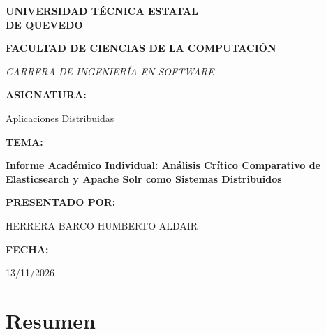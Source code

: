\documentclass[12pt,a4paper]{article}
\begin{document}
\thispagestyle{empty}
\begin{center}
\vspace*{1.5cm}

{\fontsize{22}{26}\selectfont\bfseries UNIVERSIDAD TÉCNICA ESTATAL\\[4pt] DE QUEVEDO\par}

\vspace{1.4cm}

{\large\bfseries FACULTAD DE CIENCIAS DE LA COMPUTACIÓN\par}

\vspace{1.2cm}

{\small\itshape CARRERA DE INGENIERÍA EN SOFTWARE\par}

\vspace{1.2cm}

{\large\bfseries ASIGNATURA:\par}
{\large Aplicaciones Distribuidas\par}

{\large\bfseries TEMA:\par}
\vspace{0.4cm}
{\large\bfseries Informe Académico Individual: Análisis Crítico Comparativo de Elasticsearch y Apache Solr como Sistemas Distribuidos\par}

\vspace{1.0cm}

{\large\bfseries PRESENTADO POR:\par}
\vspace{2pt}
{\large HERRERA BARCO HUMBERTO ALDAIR\par}

\vspace{1.0cm}

{\large\bfseries FECHA:\par}
{\large 13/11/2026\par}

\end{center}

\newpage
\tableofcontents
\newpage

\section*{Resumen}
\end{document}
